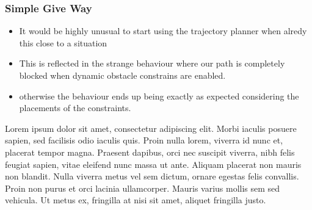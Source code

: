 \subsubsection{Simple Give Way}
\begin{itemize}
    \item It would be highly unusual to start using the trajectory planner when alredy this close to a situation
    \item This is reflected in the strange behaviour where our path is completely blocked when dynamic obstacle constrains are enabled.
    \item otherwise the behaviour ends up being exactly as expected considering the placements of the constraints.
\end{itemize}
Lorem ipsum dolor sit amet, consectetur adipiscing elit. Morbi iaculis posuere sapien, sed facilisis odio iaculis quis. 
Proin nulla lorem, viverra id nunc et, placerat tempor magna. Praesent dapibus, orci nec suscipit viverra, nibh felis feugiat sapien, 
vitae eleifend nunc massa ut ante. Aliquam placerat non mauris non blandit. Nulla viverra metus vel sem dictum, ornare egestas felis convallis. 
Proin non purus et orci lacinia ullamcorper. Mauris varius mollis sem sed vehicula. Ut metus ex, fringilla at nisi sit amet, aliquet fringilla justo.

